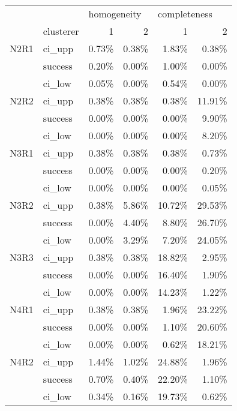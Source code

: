 \begin{tabular}{llrrrr}
\toprule
     & {} & \multicolumn{2}{l}{homogeneity} & \multicolumn{2}{l}{completeness} \\
     & clusterer &           1 &      2 &            1 &      2 \\
\midrule
N2R1 & ci\_upp &       0.73\% &  0.38\% &        1.83\% &  0.38\% \\
     & success &       0.20\% &  0.00\% &        1.00\% &  0.00\% \\
     & ci\_low &       0.05\% &  0.00\% &        0.54\% &  0.00\% \\
N2R2 & ci\_upp &       0.38\% &  0.38\% &        0.38\% & 11.91\% \\
     & success &       0.00\% &  0.00\% &        0.00\% &  9.90\% \\
     & ci\_low &       0.00\% &  0.00\% &        0.00\% &  8.20\% \\
N3R1 & ci\_upp &       0.38\% &  0.38\% &        0.38\% &  0.73\% \\
     & success &       0.00\% &  0.00\% &        0.00\% &  0.20\% \\
     & ci\_low &       0.00\% &  0.00\% &        0.00\% &  0.05\% \\
N3R2 & ci\_upp &       0.38\% &  5.86\% &       10.72\% & 29.53\% \\
     & success &       0.00\% &  4.40\% &        8.80\% & 26.70\% \\
     & ci\_low &       0.00\% &  3.29\% &        7.20\% & 24.05\% \\
N3R3 & ci\_upp &       0.38\% &  0.38\% &       18.82\% &  2.95\% \\
     & success &       0.00\% &  0.00\% &       16.40\% &  1.90\% \\
     & ci\_low &       0.00\% &  0.00\% &       14.23\% &  1.22\% \\
N4R1 & ci\_upp &       0.38\% &  0.38\% &        1.96\% & 23.22\% \\
     & success &       0.00\% &  0.00\% &        1.10\% & 20.60\% \\
     & ci\_low &       0.00\% &  0.00\% &        0.62\% & 18.21\% \\
N4R2 & ci\_upp &       1.44\% &  1.02\% &       24.88\% &  1.96\% \\
     & success &       0.70\% &  0.40\% &       22.20\% &  1.10\% \\
     & ci\_low &       0.34\% &  0.16\% &       19.73\% &  0.62\% \\

\end{tabular}

